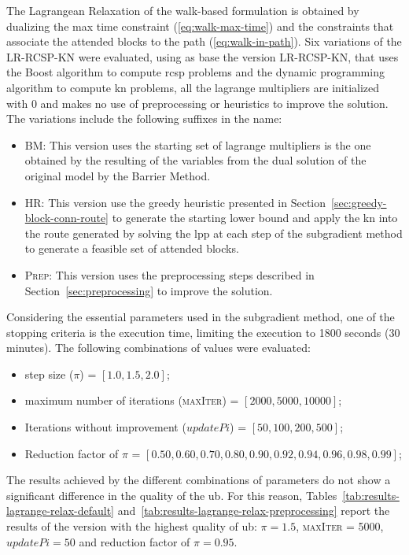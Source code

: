 The Lagrangean Relaxation of the walk-based formulation is obtained by dualizing the max time constraint (\eqref{eq:walk-max-time}) and the constraints that associate the attended blocks to the path (\eqref{eq:walk-in-path}).
Six variations of the LR-RCSP-KN were evaluated, using as base the version LR-RCSP-KN, that uses the Boost algorithm to compute \gls{rcsp} problems and the dynamic programming algorithm to compute \gls{kn} problems, all the lagrange multipliers are initialized with 0 and makes no use of preprocessing or heuristics to improve the solution. The variations include the following suffixes in the name:

\begin{itemize}
	\item \textsc{BM}: This version uses the starting set of lagrange multipliers is the one obtained by the resulting of the variables from the dual solution of the original model by the Barrier Method.
	\item \textsc{HR}: This version use the greedy heuristic presented in Section~\ref{sec:greedy-block-conn-route} to generate the starting lower bound and apply the \gls{kn} into the route generated by solving the \gls{lpp} at each step of the subgradient method to generate a feasible set of attended blocks.
	\item \textsc{Prep}: This version uses the preprocessing steps described in Section~\ref{sec:preprocessing} to improve the solution.
\end{itemize}

Considering the essential parameters used in the subgradient method, one of the stopping criteria is the execution time, limiting the execution to 1800 seconds (30 minutes). The following combinations of values were evaluated:

\begin{itemize}
	\item step size ($\pi$) = $[1.0, 1.5, 2.0]$;
	\item maximum number of iterations (\textsc{maxIter}) = $[2000, 5000, 10000]$;
	\item Iterations without improvement ($updatePi$) = $[50, 100, 200, 500]$;
	\item Reduction factor of $\pi$ = $[0.50, 0.60, 0.70, 0.80, 0.90, 0.92, 0.94, 0.96, 0.98, 0.99]$;
\end{itemize}

The results achieved by the different combinations of parameters do not show a significant difference in the quality of the \gls{ub}. For this reason, Tables~\ref{tab:results-lagrange-relax-default} and~\ref{tab:results-lagrange-relax-preprocessing} report the results of the version with the highest quality of \gls{ub}: $\pi = 1.5$, \textsc{maxIter} = 5000, $updatePi = 50$ and reduction factor of $\pi = 0.95$.

